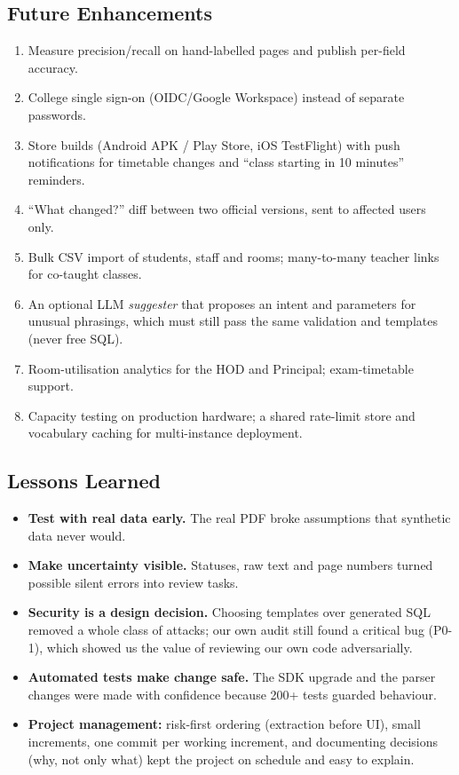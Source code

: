 \subsection{Future Enhancements}
\begin{enumerate}
\item Measure precision/recall on hand-labelled pages and publish per-field accuracy.
\item College single sign-on (OIDC/Google Workspace) instead of separate passwords.
\item Store builds (Android APK / Play Store, iOS TestFlight) with push notifications for timetable
      changes and ``class starting in 10 minutes'' reminders.
\item ``What changed?'' diff between two official versions, sent to affected users only.
\item Bulk CSV import of students, staff and rooms; many-to-many teacher links for co-taught classes.
\item An optional LLM \emph{suggester} that proposes an intent and parameters for unusual phrasings,
      which must still pass the same validation and templates (never free SQL).
\item Room-utilisation analytics for the HOD and Principal; exam-timetable support.
\item Capacity testing on production hardware; a shared rate-limit store and vocabulary caching for
      multi-instance deployment.
\end{enumerate}

\subsection{Lessons Learned}
\begin{itemize}
\item \textbf{Test with real data early.} The real PDF broke assumptions that synthetic data never would.
\item \textbf{Make uncertainty visible.} Statuses, raw text and page numbers turned possible silent
      errors into review tasks.
\item \textbf{Security is a design decision.} Choosing templates over generated SQL removed a whole
      class of attacks; our own audit still found a critical bug (P0-1), which showed us the value of reviewing our own code adversarially.
\item \textbf{Automated tests make change safe.} The SDK upgrade and the parser changes were made with
      confidence because 200+ tests guarded behaviour.
\item \textbf{Project management:} risk-first ordering (extraction before UI), small increments,
      one commit per working increment, and documenting decisions (why, not only what) kept the
      project on schedule and easy to explain.
\end{itemize}

\newpage
